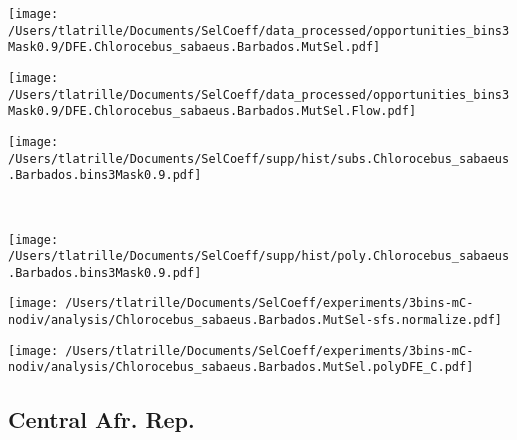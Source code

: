 \documentclass{article}
\begin{document}
    \begin{minipage}{0.32\linewidth}
        \texttt{[image: /Users/tlatrille/Documents/SelCoeff/data\_processed/opportunities\_bins3Mask0.9/DFE.Chlorocebus\_sabaeus.Barbados.MutSel.pdf]}
    \end{minipage}
    \begin{minipage}{0.32\linewidth}
        \texttt{[image: /Users/tlatrille/Documents/SelCoeff/data\_processed/opportunities\_bins3Mask0.9/DFE.Chlorocebus\_sabaeus.Barbados.MutSel.Flow.pdf]}
    \end{minipage}
    \begin{minipage}{0.32\linewidth}
        \texttt{[image: /Users/tlatrille/Documents/SelCoeff/supp/hist/subs.Chlorocebus\_sabaeus.Barbados.bins3Mask0.9.pdf]}
    \end{minipage}
    \\
    \begin{minipage}{0.32\linewidth}
        \texttt{[image: /Users/tlatrille/Documents/SelCoeff/supp/hist/poly.Chlorocebus\_sabaeus.Barbados.bins3Mask0.9.pdf]}
    \end{minipage}
    \begin{minipage}{0.32\linewidth}
        \texttt{[image: /Users/tlatrille/Documents/SelCoeff/experiments/3bins-mC-nodiv/analysis/Chlorocebus\_sabaeus.Barbados.MutSel-sfs.normalize.pdf]}
    \end{minipage}
    \begin{minipage}{0.32\linewidth}
        \texttt{[image: /Users/tlatrille/Documents/SelCoeff/experiments/3bins-mC-nodiv/analysis/Chlorocebus\_sabaeus.Barbados.MutSel.polyDFE\_C.pdf]}
    \end{minipage}
    \subsection{Central Afr. Rep.}
\end{document}
